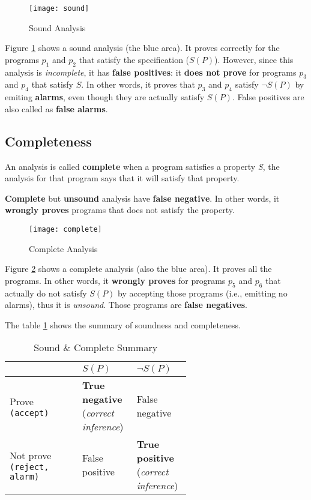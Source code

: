 \begin{figure}[h]
  \texttt{[image: sound]}
  \caption{Sound Analysis}
  \label{fig:sound}
\end{figure}

Figure \ref{fig:sound} shows a sound analysis (the blue area). It
proves correctly for the programs $ p_1 $ and $ p_2 $ that satisfy the
specification ($S(P)$). However, since this analysis is
\textit{incomplete}, it has \textbf{false positives}: it \textbf{does
  not prove} for programs $ p_3 $ and $ p_4 $ that satisfy $S$. In
other words, it proves that $ p_3 $ and $ p_4 $ satisfy $ \neg S(P) $
by emiting \textbf{alarms}, even though they are actually satisfy
$ S(P) $. False positives are also called as \textbf{false alarms}.

\subsection{Completeness}

An analysis is called \textbf{complete} when a program satisfies a
property \textsl{S}, the analysis for that program says that it will
satisfy that property.


\textbf{Complete} but \textbf{unsound} analysis have \textbf{false
  negative}. In other words, it \textbf{wrongly proves} programs that
does not satisfy the property.


\begin{figure}[h]
  \texttt{[image: complete]}
  \caption{Complete Analysis}
  \label{fig:complete}
\end{figure}

Figure \ref{fig:complete} shows a complete analysis (also the blue
area). It proves all the programs. In other words, it \textbf{wrongly
  proves} for programs $ p_5 $ and $ p_6 $ that actually do not
satisfy $ S(P) $ by accepting those programs (i.e., emitting no
alarms), thus it is \textit{unsound}. Those programs are \textbf{false
  negatives}.


The table \ref{tab:summary} shows the summary of soundness and
completeness.

\begin{table}[ht]
  \centering
  \caption{Sound \& Complete Summary}
  \label{tab:summary}

  \begin{tabular}[t]{l>{\raggedright}p{0.3\linewidth}>{\raggedright\arraybackslash}p{0.3\linewidth}}
    \hline
    & $ S(P) $ & $ \neg S(P) $ \\
    \hline
    Prove \texttt{(accept)} & \textbf{True negative} (\textsl{correct inference}) & False negative \\
    Not prove \texttt{(reject, alarm)} & False positive & \textbf{True positive} (\textsl{correct inference}) \\
    \hline
  \end{tabular}
\end{table}%



